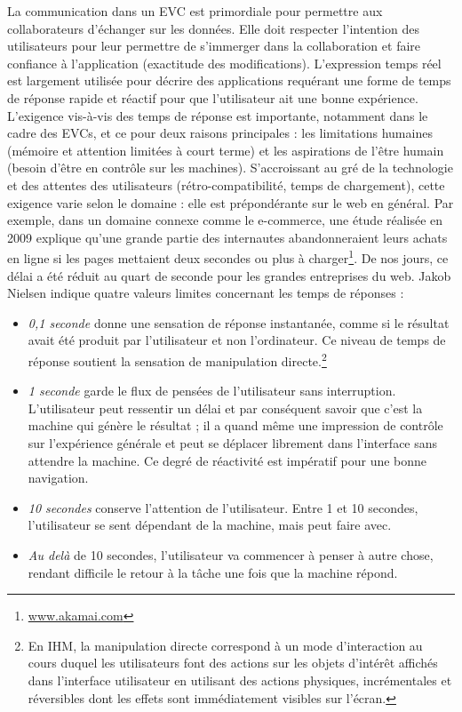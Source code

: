 La communication dans un \gls{EVC} est primordiale pour permettre aux collaborateurs d'échanger sur les données. 
Elle doit respecter l'intention des utilisateurs pour leur permettre de s'immerger dans la collaboration et faire confiance à l'application (exactitude des modifications).
L'expression temps réel est largement utilisée pour décrire des applications requérant une 
forme de temps de réponse rapide et réactif pour que l'utilisateur ait une bonne 
expérience. 
L'exigence vis-à-vis des temps de réponse est  
importante, notamment dans le cadre des \glspl{EVC}, et ce pour deux raisons principales : les limitations humaines (mémoire et 
attention limitées à court terme) et les aspirations de l'être humain (besoin d'être en contrôle sur les 
machines). S'accroissant au gré de la technologie et des attentes des 
utilisateurs (rétro-compatibilité, temps de 
chargement), cette exigence varie selon le domaine : elle est prépondérante sur le 
web en général. 
Par exemple, dans un domaine connexe comme le e-commerce, une étude réalisée 
en 2009 explique qu’une grande partie des internautes abandonneraient leurs achats 
en ligne si les pages mettaient deux secondes ou plus à 
charger\footnote{\href{https://www.akamai.com/us/en/about/news/press/2009-press/akamai-reveals-2-
		seconds-as-the-new-threshold-of-acceptability-for-ecommerce-web-page-response-times.jsp}{www.akamai.com}}.
De nos jours, ce 
délai a été réduit au quart de seconde pour les grandes entreprises du web. Jakob 
Nielsen \cite{Nielsen1993a} indique quatre valeurs limites concernant les 
temps de réponses :
\begin{itemize}
	\item \textit{0,1 seconde} donne une sensation de réponse instantanée, comme 
	si le 
	résultat avait été produit par l'utilisateur et non l'ordinateur. Ce niveau de temps 
	de réponse soutient la sensation de manipulation directe.\footnote{En IHM, la 
		manipulation directe correspond à un mode d'interaction au cours duquel les 
		utilisateurs font des actions sur les objets d'intérêt affichés dans l'interface 
		utilisateur en utilisant des actions physiques, incrémentales et réversibles 
		dont 
		les effets sont immédiatement visibles sur l'écran.} 
	\item \textit{1 seconde} garde le flux de pensées de l'utilisateur sans 
	interruption. 
	L'utilisateur peut ressentir un délai et par conséquent savoir que c'est la 
	machine qui génère le résultat ; il a quand même une impression de 
	contrôle sur l'expérience générale et peut se déplacer librement dans l'interface 
	sans attendre la machine. Ce degré de réactivité est impératif pour une bonne 
	navigation.
	\item \textit{10 secondes} conserve l'attention de l'utilisateur. Entre 1 et 10 
	secondes, l'utilisateur se sent dépendant de la machine, mais peut faire avec. 
	\item \textit{Au delà} de 10 secondes, l'utilisateur va commencer à penser à autre chose, rendant difficile 
	le retour à la tâche une fois que la machine répond.
\end{itemize} 
